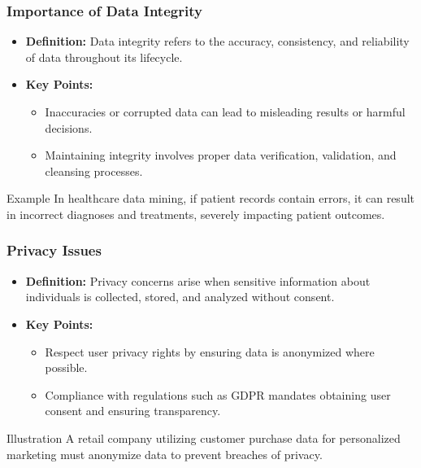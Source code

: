 \documentclass[aspectratio=169]{beamer}
\begin{document}
\begin{frame}[fragile]
    \frametitle{Importance of Data Integrity}
    \begin{itemize}
        \item \textbf{Definition:} Data integrity refers to the accuracy, consistency, and reliability of data throughout its lifecycle.
        \item \textbf{Key Points:}
        \begin{itemize}
            \item Inaccuracies or corrupted data can lead to misleading results or harmful decisions.
            \item Maintaining integrity involves proper data verification, validation, and cleansing processes. 
        \end{itemize}
    \end{itemize}
    \begin{block}{Example}
        In healthcare data mining, if patient records contain errors, it can result in incorrect diagnoses and treatments, severely impacting patient outcomes.
    \end{block}
\end{frame}

\begin{frame}[fragile]
    \frametitle{Privacy Issues}
    \begin{itemize}
        \item \textbf{Definition:} Privacy concerns arise when sensitive information about individuals is collected, stored, and analyzed without consent.
        \item \textbf{Key Points:}
        \begin{itemize}
            \item Respect user privacy rights by ensuring data is anonymized where possible.
            \item Compliance with regulations such as GDPR mandates obtaining user consent and ensuring transparency.
        \end{itemize}
    \end{itemize}
    \begin{block}{Illustration}
        A retail company utilizing customer purchase data for personalized marketing must anonymize data to prevent breaches of privacy.
    \end{block}
\end{frame}
\end{document}
